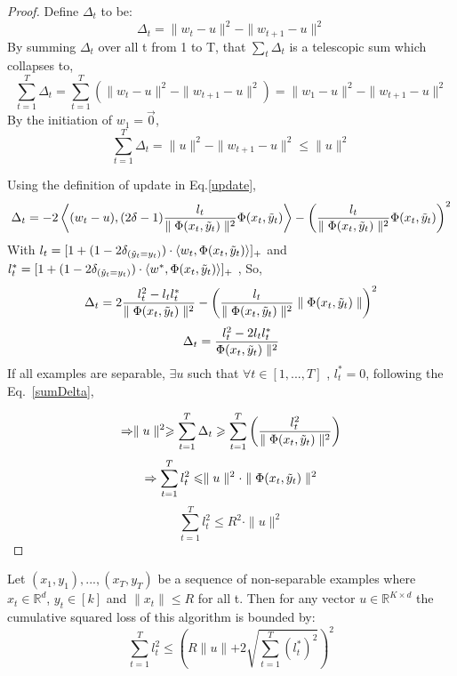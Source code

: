 \begin{proof}
Define $\Delta_t$ to be:
\[\Delta_t = \parallel{w_t-u}\parallel^2-\parallel{w_{t+1}-u}\parallel^2\]
By summing $\Delta_t$ over all t from 1 to T, that $\sum_t \Delta_t$ is a telescopic sum which collapses to,
\[\sum_{t=1}^{T}\Delta_t = \sum_{t=1}^{T} \left( \parallel{w_t - u}\parallel^2-\parallel{w_{t+1} - u}\parallel^2 \right) = \parallel{w_1 - u}\parallel^2-\parallel{w_{t+1}-u}\parallel^2\]
By the initiation of $w_1 = \vec{0}$, 
\begin{equation}
\label{equa:delta}
\sum_{t=1}^{T}\Delta_t = \parallel{u}\parallel^2 - \parallel{w_{t+1}-u}\parallel^2 \leqslant \parallel{u}\parallel^2 
\end{equation}

Using the definition of update in Eq.\ref{update},
\[\Delta_t = -2\left< (w_t - u), (2\delta-1)\frac{l_t}{\parallel{\Phi(x_t,\tilde{y}_t)}\parallel^2}\Phi(x_t,\tilde{y}_t)\right> - \left( \frac{l_t}{\parallel{\Phi(x_t,\tilde{y}_t)}\parallel^2}\Phi(x_t,\tilde{y}_t)\right)^2\]
With  $l_t = [1+(1-2\delta_{(\tilde{y}_t = y_t)})\cdot\langle w_t,\Phi(x_t,\tilde{y}_t)\rangle]_+$  and  $l_t^{\ast} = [1+(1-2\delta_{(\tilde{y}_t = y_t)})\cdot\langle w^{\ast},\Phi(x_t,\tilde{y}_t)\rangle]_+$ ,
So, 
\[\Delta_t = 2\frac{l_t^2 - l_t l_t^{\ast}}{\parallel{\Phi(x_t,\tilde{y}_t)}\parallel^2}-\left( \frac{l_t}{\parallel{\Phi(x_t,\tilde{y}_t)}\parallel^2}\parallel{\Phi(x_t,\tilde{y}_t)}\parallel \right)^2\]
\[\Delta_t = \frac{l_t^2-2l_t l_t^{\ast}}{\Phi(x_t,\tilde{y}_t)\parallel^2}\]
If all examples are separable, $\exists u$ such that $\forall t \in [1,...,T]$ , $l_t^{\ast} = 0$, following the Eq.~\ref{sumDelta},

\[\Rightarrow \parallel{u}\parallel^2 \geqslant \sum_{t=1}^{T}\Delta_t \geqslant \sum_{t=1}^{T} \left( \frac{l_t^2}{\parallel{\Phi(x_t,\tilde{y}_t)}\parallel^2}\right)\]
\[\Rightarrow \sum_{t=1}^{T} l_t^2 \leqslant\parallel{u}\parallel^2 \cdot \parallel{\Phi(x_t,\tilde{y}_t)}\parallel^2\]
\[\sum_{t=1}^{T} l_t^2 \leqslant R^2 \cdot \parallel{u}\parallel^2\]
\end{proof}
\begin{theo}
\label{theo:BPAT2}
Let $(x_1,y_1),...,(x_T,y_T) $ be a sequence of non-separable examples where  $x_t\in \mathbb{R}^d$, $y_t \in [k]$ and $\parallel{x_t}\parallel \leqslant R$ for all t. Then for any vector $u \in \mathbb{R}^{K\times d}$ the cumulative squared loss of this algorithm is bounded by:
\[\sum_{t=1}^{T}l_t^2 \leqslant \left(R\parallel{u}\parallel+2 \sqrt{\sum_{t=1}^{T}(l_t^{\ast})^2}\right)^2 \]
\end{theo}

